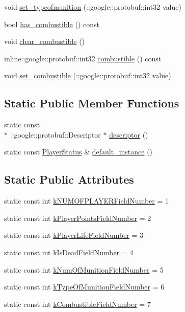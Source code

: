 \begin{DoxyCompactItemize}
\item 
void \hyperlink{class_player_status_a71302f023e61c011a72a257c8ea5cb6e}{set\-\_\-typeofmunition} (\-::google\-::protobuf\-::int32 value)
\item 
bool \hyperlink{class_player_status_a5fd8e8bc7150715dff17890d0f2ba2b5}{has\-\_\-combustible} () const 
\item 
void \hyperlink{class_player_status_adbfd6aeb497ff46eeec87cbb9241b45e}{clear\-\_\-combustible} ()
\item 
inline\-::google\-::protobuf\-::int32 \hyperlink{class_player_status_abffad29c44d3df78f1f0e16da159a570}{combustible} () const 
\item 
void \hyperlink{class_player_status_a6ccd28b6811ebadefa2378881a22fc14}{set\-\_\-combustible} (\-::google\-::protobuf\-::int32 value)
\end{DoxyCompactItemize}
\subsection*{Static Public Member Functions}
\begin{DoxyCompactItemize}
\item 
static const \\*
\-::google\-::protobuf\-::\-Descriptor $\ast$ \hyperlink{class_player_status_ab7af70a3b8976e2a2971f67dd88d2ee0}{descriptor} ()
\item 
static const \hyperlink{class_player_status}{Player\-Status} \& \hyperlink{class_player_status_a48e587242903b11af6171a3307bdac91}{default\-\_\-instance} ()
\end{DoxyCompactItemize}
\subsection*{Static Public Attributes}
\begin{DoxyCompactItemize}
\item 
static const int \hyperlink{class_player_status_a1420e7c20cf4424d3c25d4774f3b02a3}{k\-N\-U\-M\-O\-F\-P\-L\-A\-Y\-E\-R\-Field\-Number} = 1
\item 
static const int \hyperlink{class_player_status_acf4acbabe53753e3554a06ef928683a0}{k\-Player\-Points\-Field\-Number} = 2
\item 
static const int \hyperlink{class_player_status_a335a1328cd6c4be06ecb9c13e6ea9abf}{k\-Player\-Life\-Field\-Number} = 3
\item 
static const int \hyperlink{class_player_status_aa4c5235c27c896e7f2723c6c74a218a4}{k\-Is\-Dead\-Field\-Number} = 4
\item 
static const int \hyperlink{class_player_status_a1652b02aee1015ef64aeb10192344360}{k\-Num\-Of\-Munition\-Field\-Number} = 5
\item 
static const int \hyperlink{class_player_status_a5afa1140c6bf97e7a35b8c15a529022e}{k\-Type\-Of\-Munition\-Field\-Number} = 6
\item 
static const int \hyperlink{class_player_status_a79b1d6540d45cbfb5f2597a4321a139c}{k\-Combustible\-Field\-Number} = 7
\end{DoxyCompactItemize}
